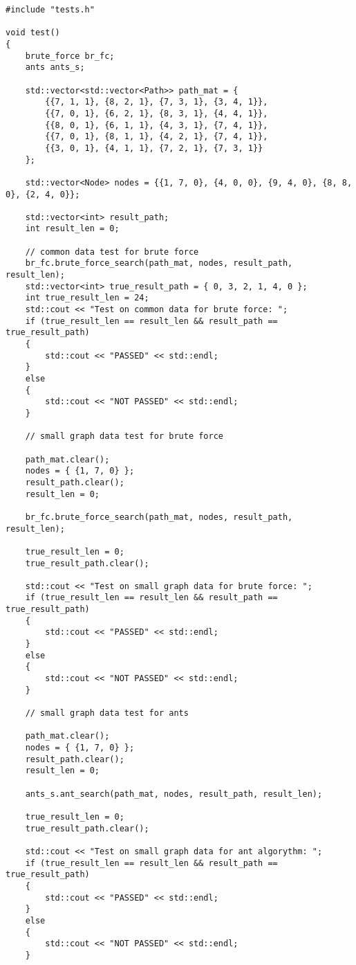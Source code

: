 \begin{lstlisting}[label=some-code-7,caption=Реализация тестов]      
#include "tests.h"

void test()
{
    brute_force br_fc;
    ants ants_s;

    std::vector<std::vector<Path>> path_mat = {
        {{7, 1, 1}, {8, 2, 1}, {7, 3, 1}, {3, 4, 1}},
        {{7, 0, 1}, {6, 2, 1}, {8, 3, 1}, {4, 4, 1}},
        {{8, 0, 1}, {6, 1, 1}, {4, 3, 1}, {7, 4, 1}},
        {{7, 0, 1}, {8, 1, 1}, {4, 2, 1}, {7, 4, 1}},
        {{3, 0, 1}, {4, 1, 1}, {7, 2, 1}, {7, 3, 1}}
    };

    std::vector<Node> nodes = {{1, 7, 0}, {4, 0, 0}, {9, 4, 0}, {8, 8, 0}, {2, 4, 0}};

    std::vector<int> result_path;
    int result_len = 0;

    // common data test for brute force
    br_fc.brute_force_search(path_mat, nodes, result_path, result_len);
    std::vector<int> true_result_path = { 0, 3, 2, 1, 4, 0 };
    int true_result_len = 24;
    std::cout << "Test on common data for brute force: ";
    if (true_result_len == result_len && result_path == true_result_path)
    {
        std::cout << "PASSED" << std::endl;
    }
    else
    {
        std::cout << "NOT PASSED" << std::endl;
    }

    // small graph data test for brute force

    path_mat.clear();
    nodes = { {1, 7, 0} };
    result_path.clear();
    result_len = 0;

    br_fc.brute_force_search(path_mat, nodes, result_path, result_len);

    true_result_len = 0;
    true_result_path.clear();

    std::cout << "Test on small graph data for brute force: ";
    if (true_result_len == result_len && result_path == true_result_path)
    {
        std::cout << "PASSED" << std::endl;
    }
    else
    {
        std::cout << "NOT PASSED" << std::endl;
    }

    // small graph data test for ants

    path_mat.clear();
    nodes = { {1, 7, 0} };
    result_path.clear();
    result_len = 0;

    ants_s.ant_search(path_mat, nodes, result_path, result_len);

    true_result_len = 0;
    true_result_path.clear();

    std::cout << "Test on small graph data for ant algorythm: ";
    if (true_result_len == result_len && result_path == true_result_path)
    {
        std::cout << "PASSED" << std::endl;
    }
    else
    {
        std::cout << "NOT PASSED" << std::endl;
    }


\end{lstlisting}
